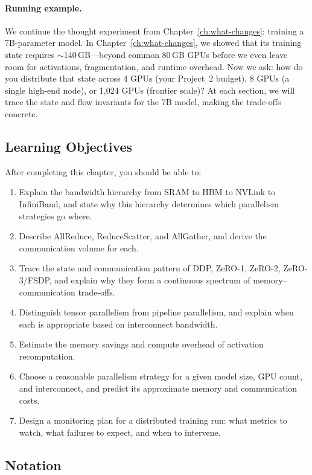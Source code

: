 \paragraph{Running example.} We continue the thought experiment from Chapter~\ref{ch:what-changes}: training a 7B-parameter model. In Chapter~\ref{ch:what-changes}, we showed that its training state requires $\sim$140\,GB---beyond common 80\,GB GPUs before we even leave room for activations, fragmentation, and runtime overhead. Now we ask: how do you distribute that state across 4 GPUs (your Project~2 budget), 8 GPUs (a single high-end node), or 1,024 GPUs (frontier scale)? At each section, we will trace the state and flow invariants for the 7B model, making the trade-offs concrete.


\subsection*{Learning Objectives}

After completing this chapter, you should be able to:

\begin{enumerate}
  \item Explain the bandwidth hierarchy from SRAM to HBM to NVLink to InfiniBand, and state why this hierarchy determines which parallelism strategies go where.
  \item Describe AllReduce, ReduceScatter, and AllGather, and derive the communication volume for each.
  \item Trace the state and communication pattern of DDP, ZeRO-1, ZeRO-2, ZeRO-3/FSDP, and explain why they form a continuous spectrum of memory--communication trade-offs.
  \item Distinguish tensor parallelism from pipeline parallelism, and explain when each is appropriate based on interconnect bandwidth.
  \item Estimate the memory savings and compute overhead of activation recomputation.
  \item Choose a reasonable parallelism strategy for a given model size, GPU count, and interconnect, and predict its approximate memory and communication costs.
  \item Design a monitoring plan for a distributed training run: what metrics to watch, what failures to expect, and when to intervene.
\end{enumerate}


\subsection*{Notation}

